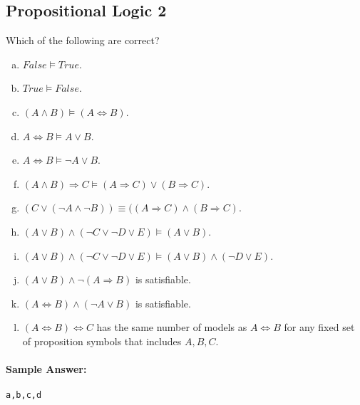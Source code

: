\documentclass[11pt, answers]{exam}
\begin{document}
%
%
\begin{questions}
\section{Propositional Logic 2}
\question

Which of the following are correct?
\begin{enumerate}[a.]
\item $False \models True$.
\item $True \models False$.
\item $(A \wedge B) \models (A \Leftrightarrow B)$.
\item $A \Leftrightarrow B \models A \vee B$.
\item $A \Leftrightarrow B \models \neg A \vee B$.
\item $(A\wedge B) \Rightarrow C \models (A\Rightarrow C)\vee (B\Rightarrow C)$.
\item $(C\vee(\neg A\wedge\neg B))\equiv((A\Rightarrow C)\wedge(B\Rightarrow C)$.
\item $(A\vee B)\wedge(\neg C\vee\neg D\vee E)\models(A\vee B)$.
\item $(A\vee B)\wedge(\neg C\vee \neg D\vee E)\models (A\vee B)\wedge(\neg D\vee E)$.
\item $(A\vee B)\wedge \neg(A\Rightarrow B)$ is satisfiable.
\item $(A\Leftrightarrow B)\wedge(\neg A\vee B)$ is satisfiable.
\item $(A \Leftrightarrow B)\Leftrightarrow C$ has the same number of models as $A\Leftrightarrow B$ for any fixed set of proposition symbols that includes $A, B, C$.
\end{enumerate}

\paragraph{Sample Answer:}
\begin{verbatim}
a,b,c,d
\end{verbatim}
\end{questions}
\end{document}
